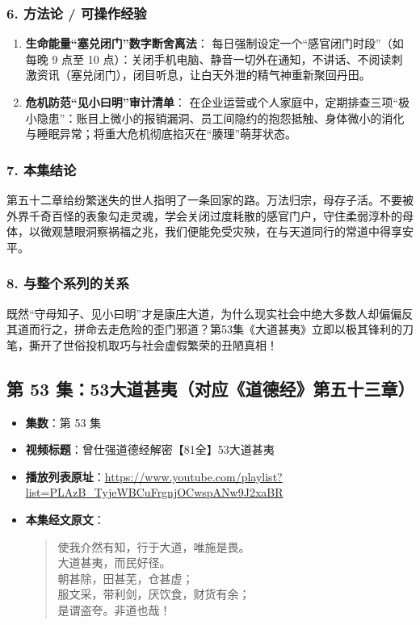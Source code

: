 \subsubsection{6. 方法论 / 可操作经验}
\begin{enumerate}
    \item \textbf{生命能量“塞兑闭门”数字断舍离法}：
    每日强制设定一个“感官闭门时段”（如每晚 9 点至 10 点）：关闭手机电脑、静音一切外在通知，不讲话、不阅读刺激资讯（塞兑闭门），闭目听息，让白天外泄的精气神重新聚回丹田。
    \item \textbf{危机防范“见小曰明”审计清单}：
    在企业运营或个人家庭中，定期排查三项“极小隐患”：账目上微小的报销漏洞、员工间隐约的抱怨抵触、身体微小的消化与睡眠异常；将重大危机彻底掐灭在“腠理”萌芽状态。
\end{enumerate}

\subsubsection{7. 本集结论}
第五十二章给纷繁迷失的世人指明了一条回家的路。万法归宗，母存子活。不要被外界千奇百怪的表象勾走灵魂，学会关闭过度耗散的感官门户，守住柔弱淳朴的母体，以微观慧眼洞察祸福之兆，我们便能免受灾殃，在与天道同行的常道中得享安平。

\subsubsection{8. 与整个系列的关系}
既然“守母知子、见小曰明”才是康庄大道，为什么现实社会中绝大多数人却偏偏反其道而行之，拼命去走危险的歪门邪道？第53集《大道甚夷》立即以极其锋利的刀笔，撕开了世俗投机取巧与社会虚假繁荣的丑陋真相！

\clearpage

\subsection{第 53 集：53大道甚夷（对应《道德经》第五十三章）}
\label{sec:ep53}

\begin{itemize}
    \item \textbf{集数}：第 53 集
    \item \textbf{视频标题}：曾仕强道德经解密【81全】53大道甚夷
    \item \textbf{播放列表原址}：\url{https://www.youtube.com/playlist?list=PLAzB_TyjeWBCuFrgnjOCwspANw9J2xaBR}
    \item \textbf{本集经文原文}：
    \begin{quote}\kaishu
    使我介然有知，行于大道，唯施是畏。\\
    大道甚夷，而民好径。\\
    朝甚除，田甚芜，仓甚虚；\\
    服文采，带利剑，厌饮食，财货有余；\\
    是谓盗夸。非道也哉！
    \end{quote}
\end{itemize}

